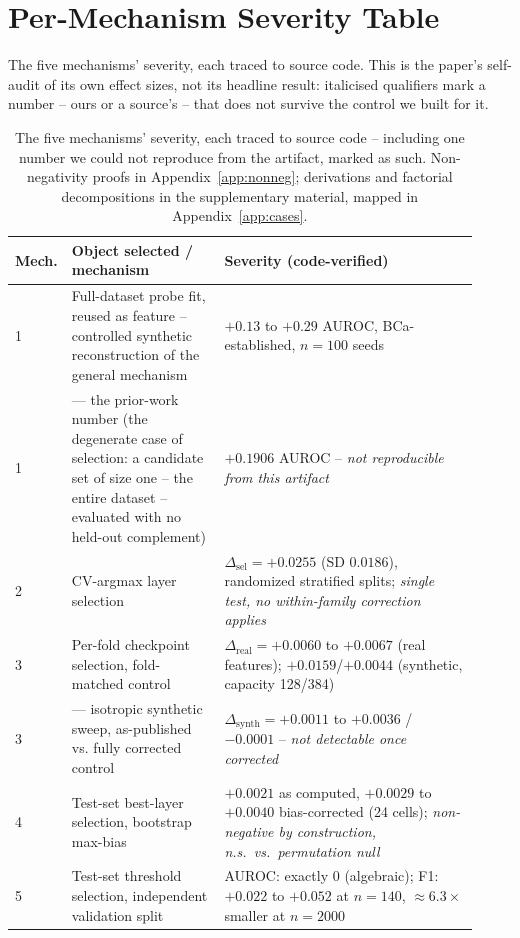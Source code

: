 \documentclass{article}
\begin{document}
\section{Per-Mechanism Severity Table}
\label{app:severity}
The five mechanisms' severity, each traced to source code. This is the
paper's self-audit of its own effect sizes, not its headline result:
italicised qualifiers mark a number -- ours or a source's -- that does not
survive the control we built for it.

\begin{table}[t]
\centering
\small
{\setlength{\tabcolsep}{3pt}
\begin{tabular}{@{}p{0.04\linewidth}p{0.33\linewidth}p{0.55\linewidth}@{}}
\toprule
Mech. & Object selected / mechanism & Severity (code-verified) \\
\midrule
1 & Full-dataset probe fit, reused as feature -- controlled synthetic reconstruction of the general mechanism & $+0.13$ to $+0.29$ AUROC, BCa-established, $n{=}100$ seeds \\
1 & --- the prior-work number (the degenerate case of selection: a candidate set of size one -- the entire dataset -- evaluated with no held-out complement) & $+0.1906$ AUROC -- \emph{not reproducible from this artifact} \\
2 & CV-argmax layer selection & $\Delta_{\text{sel}}=+0.0255$ (SD $0.0186$), randomized stratified splits; \emph{single test, no within-family correction applies} \\
3 & Per-fold checkpoint selection, fold-matched control & $\Delta_{\text{real}}=+0.0060$ to $+0.0067$ (real features); $+0.0159$/$+0.0044$ (synthetic, capacity 128/384) \\
3 & --- isotropic synthetic sweep, as-published vs. fully corrected control & $\Delta_{\text{synth}}=+0.0011$ to $+0.0036$ / $-0.0001$ -- \emph{not detectable once corrected} \\
4 & Test-set best-layer selection, bootstrap max-bias & $+0.0021$ as computed, $+0.0029$ to $+0.0040$ bias-corrected (24 cells); \emph{non-negative by construction, n.s.\ vs.\ permutation null} \\
5 & Test-set threshold selection, independent validation split & AUROC: exactly $0$ (algebraic); F1: $+0.022$ to $+0.052$ at $n{=}140$, $\approx6.3\times$ smaller at $n{=}2000$ \\
\bottomrule
\end{tabular}}
\caption{The five mechanisms' severity, each traced to source code -- including
one number we could not reproduce from the artifact, marked as such.
Non-negativity proofs in
Appendix~\ref{app:nonneg}; derivations and factorial decompositions in the
supplementary material, mapped in Appendix~\ref{app:cases}.}
\label{tab:severity}
\end{table}
\end{document}
